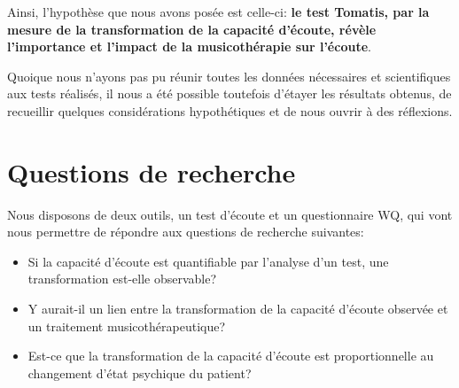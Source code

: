  
 

 Ainsi, l'hypothèse que nous avons posée est celle-ci: \textbf{le test Tomatis, par la  mesure de la  
 transformation de la capacité d'écoute, révèle  l'importance et l'impact  de la musicothérapie sur 
 l'écoute}.




Quoique nous n'ayons  pas pu réunir toutes les données nécessaires et scientifiques
aux tests réalisés, il nous a été possible toutefois d'étayer
les résultats obtenus, de recueillir quelques considérations hypothétiques et de nous ouvrir à des réflexions.







\section* {Questions de recherche}


Nous disposons de deux outils, un test d'écoute et un questionnaire WQ, qui vont nous permettre de 
répondre aux questions de recherche suivantes: 

\begin{itemize}
        \item Si la capacité d'écoute est quantifiable par
                 l'analyse d'un test,
          une transformation est-elle observable?
        \item Y aurait-il un lien entre la transformation de la capacité d'écoute observée  et un traitement 
        musicothérapeutique?
  \item Est-ce que la transformation de la capacité d'écoute est proportionnelle au changement 
  d'état psychique du patient?
   \end{itemize}



